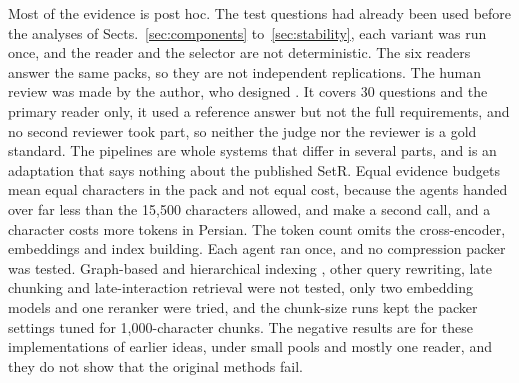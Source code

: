 Most of the evidence is post hoc. The test questions had already been used before the analyses of Sects.~\ref{sec:components} to~\ref{sec:stability}, each variant was run once, and the reader and the selector are not deterministic. The six readers answer the same packs, so they are not independent replications. The human review was made by the author, who designed \lexb{}. It covers 30 questions and the primary reader only, it used a reference answer but not the full requirements, and no second reviewer took part, so neither the judge nor the reviewer is a gold standard. The pipelines are whole systems that differ in several parts, and \setr{} is an adaptation that says nothing about the published SetR. Equal evidence budgets mean equal characters in the pack and not equal cost, because the agents handed over far less than the 15,500 characters allowed, \lexb{} and \setr{} make a second call, and a character costs more tokens in Persian. The token count omits the cross-encoder, embeddings and index building. Each agent ran once, and no compression packer was tested. Graph-based and hierarchical indexing \citep{edge2024graphrag,sarthi2024raptor}, other query rewriting, late chunking and late-interaction retrieval were not tested, only two embedding models and one reranker were tried, and the chunk-size runs kept the packer settings tuned for 1,000-character chunks. The negative results are for these implementations of earlier ideas, under small pools and mostly one reader, and they do not show that the original methods fail.
